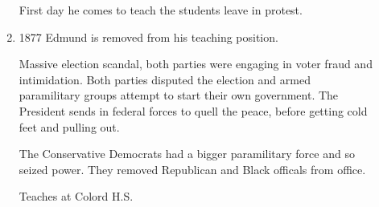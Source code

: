 \documentclass{report}
\begin{document}
\begin{description}
\begin{mdframed}
\begin{enumerate}
\begin{mdframed}
                        First day he comes to teach the students
                        leave in protest.
                    \end{mdframed}
                \item 1877 Edmund is removed from his teaching
                    position.
                    \begin{mdframed}
                        Massive election scandal, both parties
                        were engaging in voter fraud and
                        intimidation. Both parties disputed
                        the election and armed paramilitary
                        groups attempt to start their
                        own government. The President
                        sends in federal forces to quell the
                        peace, before getting cold feet and
                        pulling out.

                        The Conservative Democrats had a bigger
                        paramilitary force and so seized power.
                        They removed Republican and Black officals
                        from office.
                    \end{mdframed}
                    \begin{mdframed}
                        Teaches at Colord H.S.


\end{mdframed}
\end{enumerate}
\end{mdframed}
\end{description}
\end{document}
